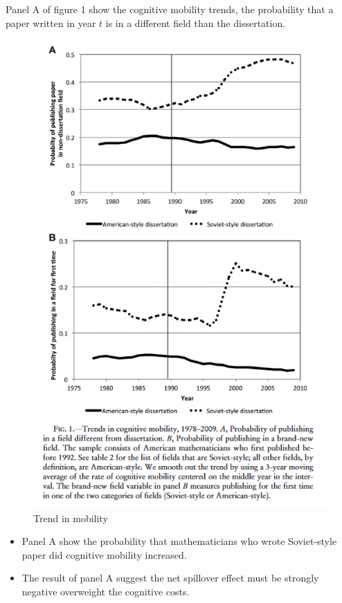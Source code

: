 \documentclass[../root]{subfiles}
\begin{document}
   Panel A of figure 1 show the cognitive mobility trends, the probability that a paper written in year $t$ is in a different field than the dissertation.  
   \begin{figure}
        \centering
        \includegraphics[width = \linewidth]{_images/0918sugiyama/Figure_1.png}
        \caption{Trend in mobility}
        \label{fig:my_label}
    \end{figure}
    
    \begin{itemize}
        \item Panel A show the probability that mathematicians who wrote Soviet-style paper did cognitive mobility increased. 
        \item The result of panel A suggest the net spillover effect must be strongly negative overweight the cognitive costs. 
    \end{itemize}
    
\end{document}
